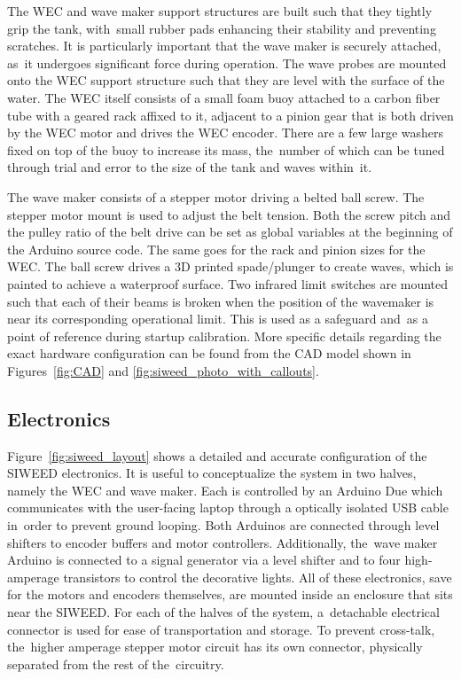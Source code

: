 \documentclass[hardware,article,submit,pdftex,moreauthors]{Definitions/mdpi}
\begin{document}
The WEC and wave maker support structures are built such that they tightly grip the tank, with~small rubber pads enhancing their stability and preventing scratches.
It is particularly important that the wave maker is securely attached, as~it undergoes significant force during operation.
The wave probes are mounted onto the WEC support structure such that they are level with the surface of the water.
The WEC itself consists of a small foam buoy attached to a carbon fiber tube with a geared rack affixed to it, adjacent to a pinion gear that is both driven by the WEC motor and drives the WEC encoder.
There are a few large washers fixed on top of the buoy to increase its mass, the~number of which can be tuned through trial and error to the size of the tank and waves within~it.


The wave maker consists of a stepper motor driving a belted ball screw.
The stepper motor mount is used to adjust the belt tension.
Both the screw pitch and the pulley ratio of the belt drive can be set as global variables at the beginning of the Arduino source code.
The same goes for the rack and pinion sizes for the WEC.
The ball screw drives a 3D printed spade/plunger to create waves, which is painted to achieve a waterproof surface.
Two infrared limit switches are mounted such that each of their beams is broken when the position of the wavemaker is near its corresponding operational limit.
This is used as a safeguard and~as a point of reference during startup calibration.
More specific details regarding the exact hardware configuration can be found from the CAD model shown in Figures~\ref{fig:CAD} and \ref{fig:siweed_photo_with_callouts}.

\subsection{Electronics}
Figure~\ref{fig:siweed_layout} shows a detailed and accurate configuration of the SIWEED electronics.
It is useful to conceptualize the system in two halves, namely the WEC and wave maker.
Each is controlled by an Arduino Due which communicates with the user-facing laptop through a optically isolated USB cable in~order to prevent ground looping.
Both Arduinos are connected through level shifters to encoder buffers and motor controllers.
Additionally, the~wave maker Arduino is connected to a signal generator via a level shifter and to four high-amperage transistors to control the decorative lights.
All of these electronics, save for the motors and encoders themselves, are mounted inside an enclosure that sits near the SIWEED.
For each of the halves of the system, a~detachable electrical connector is used for ease of transportation and storage.
To prevent cross-talk, the~higher amperage stepper motor circuit has its own connector, physically separated from the rest of the~circuitry.
\end{document}
